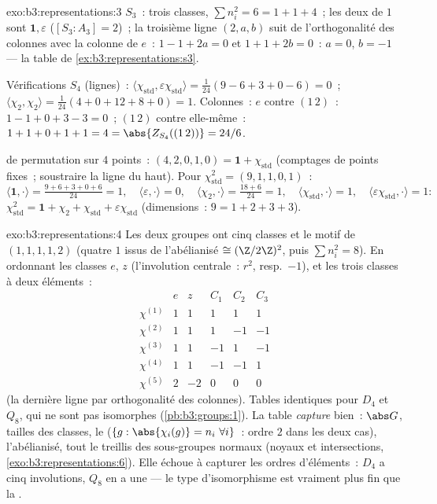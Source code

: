 \begin{solution}{exo:b3:representations:3}
$S_3$~: trois classes, $\sum n_i^2 = 6 = 1 + 1 + 4$~; les deux
 de  $1$ sont $\mathbf 1, \varepsilon$ ($[S_3 :
A_3] = 2$)~; la troisième ligne $(2, a, b)$ suit de
l'orthogonalité des colonnes avec la colonne de $e$~: $1 - 1 +
2a = 0$ et $1 + 1 + 2b = 0$~: $a = 0$, $b = -1$ --- la table de
\cref{ex:b3:representations:s3}.

Vérifications $S_4$ (lignes)~: $\langle\chi_{\mathrm{std}},
\varepsilon\chi_{\mathrm{std}}\rangle = \frac1{24}(9 - 6 + 3 + 0
- 6) = 0$~; $\langle\chi_2,\chi_2\rangle = \frac1{24}(4 + 0 + 12
+ 8 + 0) = 1$. Colonnes~: $e$ contre $(1\,2)$~: $1 - 1 + 0 + 3 -
3 = 0$~; $(1\,2)$ contre elle-même~: $1 + 1 + 0 + 1 + 1 = 4 =
\abs{Z_{S_4}((1\,2))} = 24/6$.

 de permutation sur $4$ points~: $(4, 2, 0, 1, 0) =
\mathbf 1 + \chi_{\mathrm{std}}$ (comptages de points fixes~;
soustraire la ligne du haut). Pour $\chi_{\mathrm{std}}^2 =
(9, 1, 1, 0, 1)$~:
\[
\langle\mathbf1,\cdot\rangle = \tfrac{9 + 6 + 3 + 0 + 6}{24} =
1,\quad
\langle\varepsilon,\cdot\rangle = 0,\quad
\langle\chi_2,\cdot\rangle = \tfrac{18 + 6}{24} = 1,\quad
\langle\chi_{\mathrm{std}},\cdot\rangle = 1,\quad
\langle\varepsilon\chi_{\mathrm{std}},\cdot\rangle = 1:
\]
$\chi_{\mathrm{std}}^2 = \mathbf 1 + \chi_2 +
\chi_{\mathrm{std}} + \varepsilon\chi_{\mathrm{std}}$
(dimensions~: $9 = 1 + 2 + 3 + 3$).
\end{solution}

\begin{solution}{exo:b3:representations:4}
Les deux groupes ont cinq classes et le motif de 
$(1,1,1,1,2)$ (quatre  $1$ issus de l'abélianisé $\cong
(\Z/2\Z)^2$, puis $\sum n_i^2 = 8$). En ordonnant les classes
$e$, $z$ (l'involution centrale~: $r^2$, resp.\ $-1$), et les
trois classes à deux éléments~:
\[
\begin{array}{c|ccccc}
& e & z & C_1 & C_2 & C_3\\
\hline
\chi^{(1)} & 1 & 1 & 1 & 1 & 1\\
\chi^{(2)} & 1 & 1 & 1 & -1 & -1\\
\chi^{(3)} & 1 & 1 & -1 & 1 & -1\\
\chi^{(4)} & 1 & 1 & -1 & -1 & 1\\
\chi^{(5)} & 2 & -2 & 0 & 0 & 0
\end{array}
\]
(la dernière ligne par orthogonalité des colonnes). Tables
identiques pour $D_4$ et $Q_8$, qui ne sont pas isomorphes
(\cref{pb:b3:groups:1}). La table \emph{capture} bien~: $\abs
G$, tailles des classes, le  ($\{g : \abs{\chi_i(g)} =
n_i\ \forall i\}$~: ordre $2$ dans les deux cas), l'abélianisé,
tout le treillis des sous-groupes normaux (noyaux et
intersections, \cref{exo:b3:representations:6}). Elle échoue à
capturer les ordres d'éléments~: $D_4$ a cinq involutions, $Q_8$
en a une --- le type d'isomorphisme est vraiment plus fin que
la .
\end{solution}

